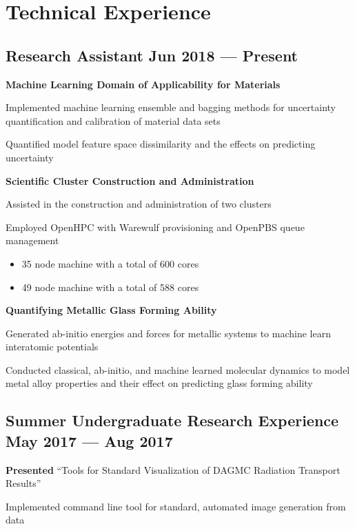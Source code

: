 \section{Technical Experience}

\subsection{{Research Assistant \hfill Jun 2018 --- Present}}
\begin{zitemize}
\item[] \textbf{Machine Learning Domain of Applicability for Materials}
    \begin{zitemize}
    \item Implemented machine learning ensemble and bagging methods for uncertainty quantification and calibration of material data sets
    \item Quantified model feature space dissimilarity and the effects on predicting uncertainty
    \end{zitemize}
\item[] \textbf{Scientific Cluster Construction and Administration}
    \begin{zitemize}
    \item Assisted in the construction and administration of two clusters
    \item Employed OpenHPC with Warewulf provisioning and OpenPBS queue management
    \begin{itemize}
        \item 35 node machine with a total of 600 cores
        \item 49 node machine with a total of 588 cores
    \end{itemize}
    \end{zitemize}
\item[] \textbf{Quantifying Metallic Glass Forming Ability}
    \begin{zitemize}
    \item Generated ab-initio energies and forces for metallic systems to machine learn interatomic potentials
    \item Conducted classical, ab-initio, and machine learned molecular dynamics to model metal alloy properties and their effect on predicting glass forming ability
    \end{zitemize}
\end{zitemize}

\subsection{{Summer Undergraduate Research Experience \hfill May 2017 --- Aug 2017}}
\begin{zitemize}
\item \textbf{Presented} ``Tools for Standard Visualization of DAGMC Radiation Transport Results''
\item Implemented command line tool for standard, automated image generation from data
\end{zitemize}


